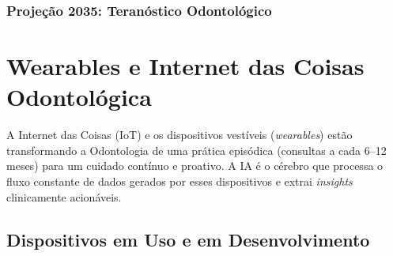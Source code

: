 \subsubsection{Projeção 2035: Teranóstico Odontológico}


\section{Wearables e Internet das Coisas Odontológica}
\label{sec:wearables-iot}

\nivelquatro

A Internet das Coisas (IoT) e os dispositivos vestíveis (\textit{wearables})
estão transformando a Odontologia de uma prática episódica (consultas a cada
6--12 meses) para um cuidado contínuo e proativo. A IA é o cérebro que processa
o fluxo constante de dados gerados por esses dispositivos e extrai
\textit{insights} clinicamente acionáveis.

 

\subsection{Dispositivos em Uso e em Desenvolvimento}

